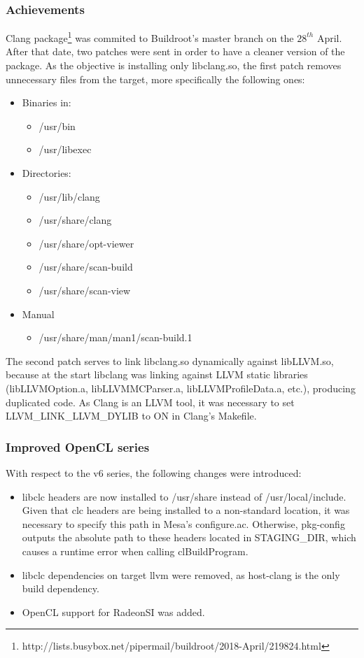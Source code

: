 \documentclass[12pt,a4paper,oneside]{article}
\begin{document}
\subsubsection*{Achievements}
Clang package\footnote{http://lists.busybox.net/pipermail/buildroot/2018-April/219824.html}
was commited to Buildroot's master branch on the $28^{th}$ April. After that date,
two patches were sent in order to have a cleaner version of the package. As the
objective is installing only libclang.so, the first patch removes unnecessary files
from the target, more specifically the following ones:
\begin{itemize}
  \item Binaries in:
  \begin{itemize}
    \item /usr/bin
    \item /usr/libexec
  \end{itemize}
  \item Directories:
  \begin{itemize}
    \item /usr/lib/clang
    \item /usr/share/clang
    \item /usr/share/opt-viewer
    \item /usr/share/scan-build
    \item /usr/share/scan-view
  \end{itemize}
  \item Manual
  \begin{itemize}
    \item /usr/share/man/man1/scan-build.1
  \end{itemize}
\end{itemize}

The second patch serves to link libclang.so dynamically against libLLVM.so,
because at the start libclang was linking against LLVM static libraries
(libLLVMOption.a, libLLVMMCParser.a, libLLVMProfileData.a, etc.), producing duplicated
code. As Clang is an LLVM tool, it was necessary to set LLVM\_LINK\_LLVM\_DYLIB
to ON in Clang's Makefile.

\subsubsection*{Improved OpenCL series}
With respect to the v6 series, the following changes were introduced:
\begin{itemize}
  \item libclc headers are now installed to /usr/share instead of /usr/local/include.
  Given that clc headers are being installed to a non-standard location, it was
  necessary to specify this path in Mesa's configure.ac. Otherwise, pkg-config
  outputs the absolute path to these headers located in STAGING\_DIR, which causes
  a runtime error when calling clBuildProgram.
  \item libclc dependencies on target llvm were removed, as host-clang is the
  only build dependency.
  \item OpenCL support for RadeonSI was added.
\end{itemize}
\end{document}
